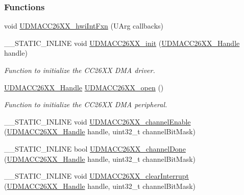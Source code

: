 \subsubsection*{Functions}
\begin{DoxyCompactItemize}
\item 
void \hyperlink{_u_d_m_a_c_c26_x_x_8h_a279762f77bf9dc5e5e12f14db1fdbaba}{U\+D\+M\+A\+C\+C26\+X\+X\+\_\+hwi\+Int\+Fxn} (U\+Arg callbacks)
\item 
\+\_\+\+\_\+\+S\+T\+A\+T\+I\+C\+\_\+\+I\+N\+L\+I\+N\+E void \hyperlink{_u_d_m_a_c_c26_x_x_8h_a8bb3d9eff25abd3378f9cbc3189440bf}{U\+D\+M\+A\+C\+C26\+X\+X\+\_\+init} (\hyperlink{_u_d_m_a_c_c26_x_x_8h_a969a9feb0f822c4764ef1da2ff5066cf}{U\+D\+M\+A\+C\+C26\+X\+X\+\_\+\+Handle} handle)
\begin{DoxyCompactList}\small\item\em Function to initialize the C\+C26\+X\+X D\+M\+A driver. \end{DoxyCompactList}\item 
\hyperlink{_u_d_m_a_c_c26_x_x_8h_a969a9feb0f822c4764ef1da2ff5066cf}{U\+D\+M\+A\+C\+C26\+X\+X\+\_\+\+Handle} \hyperlink{_u_d_m_a_c_c26_x_x_8h_aa7a244c7cfec8551f11ad5d4b5afa0ff}{U\+D\+M\+A\+C\+C26\+X\+X\+\_\+open} ()
\begin{DoxyCompactList}\small\item\em Function to initialize the C\+C26\+X\+X D\+M\+A peripheral. \end{DoxyCompactList}\item 
\+\_\+\+\_\+\+S\+T\+A\+T\+I\+C\+\_\+\+I\+N\+L\+I\+N\+E void \hyperlink{_u_d_m_a_c_c26_x_x_8h_a1eec9bde0731a07b492a9f483b0c554b}{U\+D\+M\+A\+C\+C26\+X\+X\+\_\+channel\+Enable} (\hyperlink{_u_d_m_a_c_c26_x_x_8h_a969a9feb0f822c4764ef1da2ff5066cf}{U\+D\+M\+A\+C\+C26\+X\+X\+\_\+\+Handle} handle, uint32\+\_\+t channel\+Bit\+Mask)
\item 
\+\_\+\+\_\+\+S\+T\+A\+T\+I\+C\+\_\+\+I\+N\+L\+I\+N\+E bool \hyperlink{_u_d_m_a_c_c26_x_x_8h_a5725e1db13295ef9096723f2b7c6364c}{U\+D\+M\+A\+C\+C26\+X\+X\+\_\+channel\+Done} (\hyperlink{_u_d_m_a_c_c26_x_x_8h_a969a9feb0f822c4764ef1da2ff5066cf}{U\+D\+M\+A\+C\+C26\+X\+X\+\_\+\+Handle} handle, uint32\+\_\+t channel\+Bit\+Mask)
\item 
\+\_\+\+\_\+\+S\+T\+A\+T\+I\+C\+\_\+\+I\+N\+L\+I\+N\+E void \hyperlink{_u_d_m_a_c_c26_x_x_8h_a1571fcbf7f44fca000fef38d8955eae6}{U\+D\+M\+A\+C\+C26\+X\+X\+\_\+clear\+Interrupt} (\hyperlink{_u_d_m_a_c_c26_x_x_8h_a969a9feb0f822c4764ef1da2ff5066cf}{U\+D\+M\+A\+C\+C26\+X\+X\+\_\+\+Handle} handle, uint32\+\_\+t channel\+Bit\+Mask)

\end{DoxyCompactItemize}
